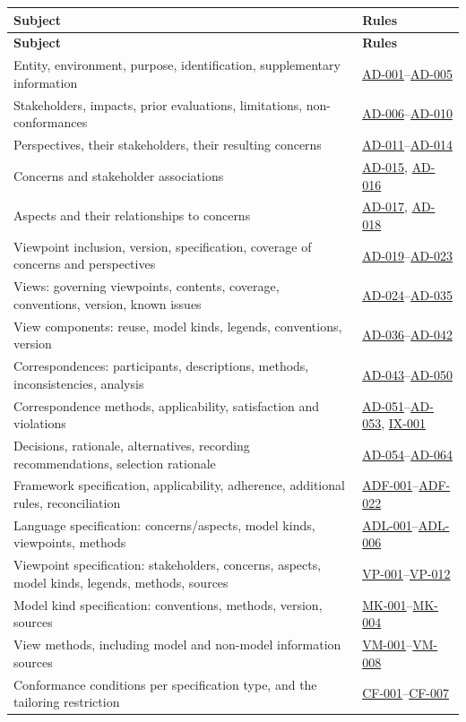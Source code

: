 \documentclass[11pt,a4paper]{report}
\newcommand{\rref}[1]{\hyperref[rule:#1]{\textsf{\small #1}}}
\begin{document}
\begin{center}
\small
\begin{longtable}{@{}L{62mm} L{74mm}@{}}
\toprule
\textbf{Subject} & \textbf{Rules} \\
\midrule
\endfirsthead
\toprule
\textbf{Subject} & \textbf{Rules} \\
\midrule
\endhead
\bottomrule
\endfoot
Entity, environment, purpose, identification, supplementary information
  & \rref{AD-001}--\rref{AD-005} \\
Stakeholders, impacts, prior evaluations, limitations, non-conformances
  & \rref{AD-006}--\rref{AD-010} \\
Perspectives, their stakeholders, their resulting concerns
  & \rref{AD-011}--\rref{AD-014} \\
Concerns and stakeholder associations
  & \rref{AD-015}, \rref{AD-016} \\
Aspects and their relationships to concerns
  & \rref{AD-017}, \rref{AD-018} \\
Viewpoint inclusion, version, specification, coverage of concerns and perspectives
  & \rref{AD-019}--\rref{AD-023} \\
Views: governing viewpoints, contents, coverage, conventions, version, known issues
  & \rref{AD-024}--\rref{AD-035} \\
View components: reuse, model kinds, legends, conventions, version
  & \rref{AD-036}--\rref{AD-042} \\
Correspondences: participants, descriptions, methods, inconsistencies, analysis
  & \rref{AD-043}--\rref{AD-050} \\
Correspondence methods, applicability, satisfaction and violations
  & \rref{AD-051}--\rref{AD-053}, \rref{IX-001} \\
Decisions, rationale, alternatives, recording recommendations, selection rationale
  & \rref{AD-054}--\rref{AD-064} \\
Framework specification, applicability, adherence, additional rules, reconciliation
  & \rref{ADF-001}--\rref{ADF-022} \\
Language specification: concerns/aspects, model kinds, viewpoints, methods
  & \rref{ADL-001}--\rref{ADL-006} \\
Viewpoint specification: stakeholders, concerns, aspects, model kinds, legends, methods, sources
  & \rref{VP-001}--\rref{VP-012} \\
Model kind specification: conventions, methods, version, sources
  & \rref{MK-001}--\rref{MK-004} \\
View methods, including model and non-model information sources
  & \rref{VM-001}--\rref{VM-008} \\
Conformance conditions per specification type, and the tailoring restriction
  & \rref{CF-001}--\rref{CF-007} \\
\bottomrule
\end{longtable}
\end{center}
\end{document}
